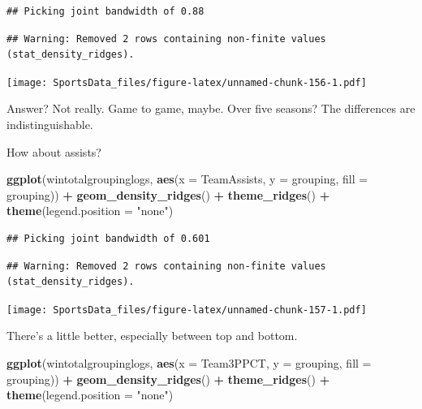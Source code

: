 \documentclass[]{book}
\newenvironment{Shaded}{\begin{snugshade}}{\end{snugshade}}
\newcommand{\DataTypeTok}[1]{\textcolor[rgb]{0.13,0.29,0.53}{#1}}
\newcommand{\KeywordTok}[1]{\textcolor[rgb]{0.13,0.29,0.53}{\textbf{#1}}}
\newcommand{\NormalTok}[1]{#1}
\newcommand{\OperatorTok}[1]{\textcolor[rgb]{0.81,0.36,0.00}{\textbf{#1}}}
\newcommand{\StringTok}[1]{\textcolor[rgb]{0.31,0.60,0.02}{#1}}
\begin{document}
\begin{verbatim}
## Picking joint bandwidth of 0.88
\end{verbatim}

\begin{verbatim}
## Warning: Removed 2 rows containing non-finite values (stat_density_ridges).
\end{verbatim}

\texttt{[image: SportsData\_files/figure-latex/unnamed-chunk-156-1.pdf]}

Answer? Not really. Game to game, maybe. Over five seasons? The differences are indistinguishable.

How about assists?

\begin{Shaded}
\begin{Highlighting}[]
\KeywordTok{ggplot}\NormalTok{(wintotalgroupinglogs, }\KeywordTok{aes}\NormalTok{(}\DataTypeTok{x =}\NormalTok{ TeamAssists, }\DataTypeTok{y =}\NormalTok{ grouping, }\DataTypeTok{fill =}\NormalTok{ grouping)) }\OperatorTok{+}
\StringTok{  }\KeywordTok{geom_density_ridges}\NormalTok{() }\OperatorTok{+}
\StringTok{  }\KeywordTok{theme_ridges}\NormalTok{() }\OperatorTok{+}\StringTok{ }
\StringTok{  }\KeywordTok{theme}\NormalTok{(}\DataTypeTok{legend.position =} \StringTok{"none"}\NormalTok{)}
\end{Highlighting}
\end{Shaded}

\begin{verbatim}
## Picking joint bandwidth of 0.601
\end{verbatim}

\begin{verbatim}
## Warning: Removed 2 rows containing non-finite values (stat_density_ridges).
\end{verbatim}

\texttt{[image: SportsData\_files/figure-latex/unnamed-chunk-157-1.pdf]}

There's a little better, especially between top and bottom.

\begin{Shaded}
\begin{Highlighting}[]
\KeywordTok{ggplot}\NormalTok{(wintotalgroupinglogs, }\KeywordTok{aes}\NormalTok{(}\DataTypeTok{x =}\NormalTok{ Team3PPCT, }\DataTypeTok{y =}\NormalTok{ grouping, }\DataTypeTok{fill =}\NormalTok{ grouping)) }\OperatorTok{+}
\StringTok{  }\KeywordTok{geom_density_ridges}\NormalTok{() }\OperatorTok{+}
\StringTok{  }\KeywordTok{theme_ridges}\NormalTok{() }\OperatorTok{+}\StringTok{ }
\StringTok{  }\KeywordTok{theme}\NormalTok{(}\DataTypeTok{legend.position =} \StringTok{"none"}\NormalTok{)}
\end{Highlighting}
\end{Shaded}
\end{document}
